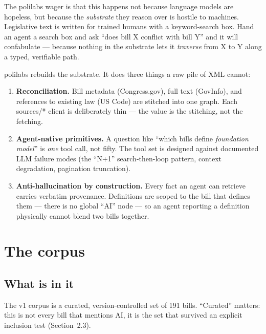 \documentclass[11pt]{article}
\newcommand{\code}[1]{{\ttfamily\small #1}}
\begin{document}
The polilabs wager is that this happens not because language models are
hopeless, but because the \emph{substrate} they reason over is hostile to
machines. Legislative text is written for trained humans with a keyword-search
box. Hand an agent a search box and ask ``does bill X conflict with bill Y''
and it will confabulate --- because nothing in the substrate lets it
\emph{traverse} from X to Y along a typed, verifiable path.

polilabs rebuilds the substrate. It does three things a raw pile of XML cannot:

\begin{enumerate}[leftmargin=1.4em,itemsep=2pt]
\item \textbf{Reconciliation.} Bill metadata (Congress.gov), full text
  (GovInfo), and references to existing law (US Code) are stitched into one
  graph. Each \code{sources/*} client is deliberately thin --- the value is the
  stitching, not the fetching.
\item \textbf{Agent-native primitives.} A question like ``which bills define
  \emph{foundation model}'' is \emph{one} tool call, not fifty. The tool set is
  designed against documented LLM failure modes (the ``N+1'' search-then-loop
  pattern, context degradation, pagination truncation).
\item \textbf{Anti-hallucination by construction.} Every fact an agent can
  retrieve carries verbatim provenance. Definitions are scoped to the bill that
  defines them --- there is no global ``AI'' node --- so an agent reporting a
  definition physically cannot blend two bills together.
\end{enumerate}

\section{The corpus}

\subsection{What is in it}

The v1 corpus is a curated, version-controlled set of 191 bills. ``Curated''
matters: this is not every bill that mentions AI, it is the set that survived an
explicit inclusion test (Section~2.3).
\end{document}
